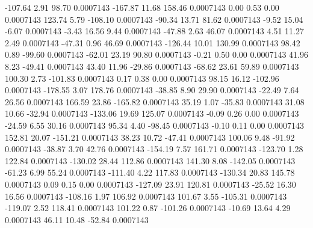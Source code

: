      -107.64        2.91       98.70     0.0007143
     -167.87       11.68      158.46     0.0007143
        0.00        0.53        0.00     0.0007143
      123.74        5.79     -108.10     0.0007143
      -90.34       13.71       81.62     0.0007143
       -9.52       15.04       -6.07     0.0007143
       -3.43       16.56        9.44     0.0007143
      -47.88        2.63       46.07     0.0007143
        4.51       11.27        2.49     0.0007143
      -47.31        0.96       46.69     0.0007143
     -126.44       10.01      130.99     0.0007143
       98.42        0.89      -99.60     0.0007143
      -62.01       23.19       90.80     0.0007143
       -0.21        0.50        0.00     0.0007143
       41.96        8.23      -49.41     0.0007143
       43.40       11.96      -29.86     0.0007143
      -68.62       23.61       59.89     0.0007143
      100.30        2.73     -101.83     0.0007143
        0.17        0.38        0.00     0.0007143
       98.15       16.12     -102.96     0.0007143
     -178.55        3.07      178.76     0.0007143
      -38.85        8.90       29.90     0.0007143
      -22.49        7.64       26.56     0.0007143
      166.59       23.86     -165.82     0.0007143
       35.19        1.07      -35.83     0.0007143
       31.08       10.66      -32.94     0.0007143
     -133.06       19.69      125.07     0.0007143
       -0.09        0.26        0.00     0.0007143
      -24.59        6.55       30.16     0.0007143
       95.34        4.40      -98.45     0.0007143
       -0.10        0.11        0.00     0.0007143
      152.81       20.07     -151.21     0.0007143
       38.23       10.72      -47.41     0.0007143
      100.06        9.48      -91.92     0.0007143
      -38.87        3.70       42.76     0.0007143
     -154.19        7.57      161.71     0.0007143
     -123.70        1.28      122.84     0.0007143
     -130.02       28.44      112.86     0.0007143
      141.30        8.08     -142.05     0.0007143
      -61.23        6.99       55.24     0.0007143
     -111.40        4.22      117.83     0.0007143
     -130.34       20.83      145.78     0.0007143
        0.09        0.15        0.00     0.0007143
     -127.09       23.91      120.81     0.0007143
      -25.52       16.30       16.56     0.0007143
     -108.16        1.97      106.92     0.0007143
      101.67        3.55     -105.31     0.0007143
     -119.07        2.52      118.41     0.0007143
      101.22        0.87     -101.26     0.0007143
      -10.69       13.64        4.29     0.0007143
       46.11       10.48      -52.84     0.0007143
